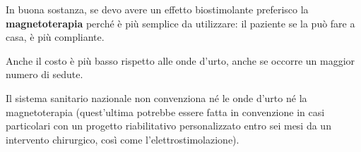 In buona sostanza, se devo avere un effetto biostimolante preferisco la
\textbf{magnetoterapia} perché è più semplice da utilizzare: il paziente
se la può fare a casa, è più compliante.

Anche il costo è più basso rispetto alle onde d'urto, anche se occorre
un maggior numero di sedute.

Il sistema sanitario nazionale non convenziona né le onde d'urto né la
magnetoterapia (quest'ultima potrebbe essere fatta in convenzione in
casi particolari con un progetto riabilitativo personalizzato entro sei
mesi da un intervento chirurgico, così come l'elettrostimolazione).

